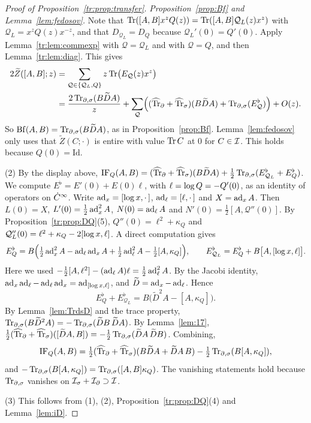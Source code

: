 \begin{proof}[Proof of Proposition~\ref{tr:prop:transfer}]
\emph{Proposition~\ref{prop:Bf} and Lemma~\ref{lem:fedosov}.} Note that
\(\operatorname{Tr}([A,B]x^zQ(z))=\operatorname{Tr}([A,B]\mathcal Q_L(z)x^z)\) with
\(\mathcal Q_L=x^zQ(z)x^{-z}\), and that \(D_{\mathcal Q_L}=D_Q\) because
\(\mathcal Q_L'(0)=Q'(0)\). Apply Lemma~\ref{tr:lem:commexp} with
\(\mathcal Q=\mathcal Q_L\) and with \(\mathcal Q=Q\), and then
Lemma~\ref{tr:lem:diag}. This gives
\begin{align*}
 2\widetilde Z([A,B];z)&=\sum_{\mathcal Q\in\{\mathcal Q_L,Q\}}z\operatorname{Tr}
 \bigl(E_{\mathcal Q}(z)x^z\bigr)\\
 &=\frac{2\operatorname{Tr}_{\partial,\sigma}(B\widetilde DA)}{z}+
 \sum_{\mathcal Q}\Bigl((\widehat{\operatorname{Tr}}_\partial+\widehat{\operatorname{Tr}}_\sigma)(B\widetilde DA)+
 \operatorname{Tr}_{\partial,\sigma}(E^\flat_{\mathcal Q})\Bigr)+O(z).
\end{align*}
So \(\operatorname{Bf}(A,B)=\operatorname{Tr}_{\partial,\sigma}(B\widetilde DA)\), as in Proposition~\ref{prop:Bf}.
Lemma~\ref{lem:fedosov} only uses that \(\widetilde Z(C;\cdot)\) is entire
with value \(\operatorname{Tr} C\) at \(0\) for \(C\in\mathcal I\). This holds because
\(Q(0)=\mathrm{Id}\).

(2) By the display above,
\(\operatorname{IF}_Q(A,B)=(\widehat{\operatorname{Tr}}_\partial+\widehat{\operatorname{Tr}}_\sigma)(B\widetilde DA)+\frac12\operatorname{Tr}_{\partial,\sigma}(E^\flat_{\mathcal
Q_L}+E^\flat_Q)\). We compute \(E^\flat=E'(0)+E(0)\ell\), with
\(\ell=\log Q=-Q'(0)\), as an identity of operators on \(\dot C^\infty\). Write
\(\operatorname{ad}_x=[\log x,\cdot\,]\), \(\operatorname{ad}_\ell=[\ell,\cdot\,]\) and
\(X=\operatorname{ad}_xA\). Then \(L(0)=X\), \(L'(0)=\frac12\operatorname{ad}_x^2A\),
\(N(0)=\operatorname{ad}_\ell A\) and \(N'(0)=\frac12[A,\mathcal Q''(0)]\). By
Proposition~\ref{tr:prop:DQ}(5), \(Q''(0)=\ell^2+\kappa_Q\) and
\(\mathcal Q_L''(0)=\ell^2+\kappa_Q-2[\log x,\ell]\). A direct computation
gives
\[
 E^\flat_Q=B\Bigl(\tfrac12\operatorname{ad}_x^2A-\operatorname{ad}_\ell\operatorname{ad}_xA+\tfrac12
 \operatorname{ad}_\ell^2A-\tfrac12[A,\kappa_Q]\Bigr),\qquad
 E^\flat_{\mathcal Q_L}=E^\flat_Q+B\bigl[A,[\log x,\ell]\bigr].
\]
Here we used \(-\frac12[A,\ell^2]-(\operatorname{ad}_\ell A)\ell=\frac12\operatorname{ad}_\ell^2A\).
By the Jacobi identity, \(\operatorname{ad}_x\operatorname{ad}_\ell-\operatorname{ad}_\ell\operatorname{ad}_x=
\operatorname{ad}_{[\log x,\ell]}\), and
\(\widetilde D=\operatorname{ad}_x-\operatorname{ad}_\ell\). Hence
\[
 E^\flat_Q+E^\flat_{\mathcal Q_L}=B\bigl(\widetilde D^2A-[A,\kappa_Q]\bigr).
\]
By Lemma~\ref{lem:TrdsD} and the trace property,
\(\operatorname{Tr}_{\partial,\sigma}(B\widetilde D^2A)=-\operatorname{Tr}_{\partial,\sigma}(\widetilde DB\,\widetilde DA)\). By
Lemma~\ref{lem:17},
\(\frac12(\widehat{\operatorname{Tr}}_\partial+\widehat{\operatorname{Tr}}_\sigma)([\widetilde DA,B])=-\frac12\operatorname{Tr}_{\partial,\sigma}(\widetilde DA\,
\widetilde DB)\). Combining,
\[
 \operatorname{IF}_Q(A,B)=\tfrac12(\widehat{\operatorname{Tr}}_\partial+\widehat{\operatorname{Tr}}_\sigma)(B\widetilde DA+\widetilde DA\,B)
 -\tfrac12\operatorname{Tr}_{\partial,\sigma}(B[A,\kappa_Q]),
\]
and \(-\operatorname{Tr}_{\partial,\sigma}(B[A,\kappa_Q])=\operatorname{Tr}_{\partial,\sigma}([A,B]\kappa_Q)\). The vanishing statements
hold because \(\operatorname{Tr}_{\partial,\sigma}\) vanishes on \(\mathcal I_\sigma+\mathcal I_\partial\supset\mathcal I\).

(3) This follows from (1), (2), Proposition~\ref{tr:prop:DQ}(4) and
Lemma~\ref{lem:iD}.
\end{proof}

